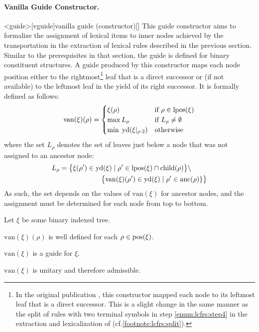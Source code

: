 \documentclass[../../document.tex]{subfiles}
\begin{document}
    \paragraph{Vanilla Guide Constructor.}<guide>[vguide]{vanilla guide (constructor)}[]
    This guide constructor aims to formalize the assignment of lexical items to inner nodes achieved by the transportation in the extraction of lexical  rules described in the previous section.
    Similar to the prerequisites in that section, the guide is defined for binary constituent structures.
    A guide produced by this constructor maps each node position either to the rightmost\footnote{
        In the original publication \citep{Rup22}, this constructor mapped each node to its leftmost leaf that is a direct successor.
        This is a slight change in the same manner as the split of rules with two terminal symbols in step \ref{enum:lcfrs:step4} in the extraction and lexicalization of  (cf.\@ \cref{footnote:lcfrs:split}).
    } leaf that is a direct successor or (if not available) to the leftmost leaf in the yield of its right successor.
    It is formally defined as follows:
    \[
    \mathrm{van}(\xi)(\rho) = \begin{cases}
        \xi(\rho)   & \text{if $\rho \in \operatorname{lpos}(\xi)$}\\
        \max L_\rho & \text{if $L_\rho \neq \emptyset$} \\
        \min\;\operatorname{yd}(\xi|_{\rho\cdot 2}) &\text{otherwise}
    \end{cases}
    \]
    where the set \(L_\rho\) denotes the set of leaves just below a node that was not assigned to an ancestor node:
    \begin{align*}
        L_\rho &= \big\{\xi(\rho') \in \operatorname{yd}(\xi) \mid \rho' \in \operatorname{lpos}(\xi) \cap \operatorname{child}(\rho) \big\} \setminus \\
        &\qquad\qquad\qquad  \big\{\mathrm{van}(\xi)(\rho') \in \operatorname{yd}(\xi) \mid \rho' \in \operatorname{anc}(\rho)\} \big\}
    \end{align*}
    As such, the set depends on the values of \(\mathrm{van}(\xi)\) for ancestor nodes, and the assignment must be determined for each node from top to bottom.

    \begin{theorem}
        Let \(\xi\) be some binary indexed tree.
        \begin{compactenum}
            \item \(\mathrm{van}(\xi)(\rho)\) is well defined for each \(\rho \in \operatorname{pos}(\xi)\).
            \item \(\mathrm{van}(\xi)\) is a guide for \(\xi\).
            \item \(\mathrm{van}(\xi)\) is unitary and therefore admissible.
        \end{compactenum}
    \end{theorem}
\end{document}
